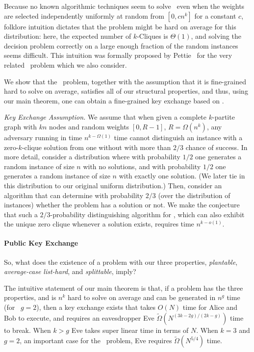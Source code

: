 Because no known algorithmic techniques seem to solve \zkclique~even when the weights are selected independently uniformly at random from $[0,cn^k]$ for a constant $c$, folklore intuition dictates that the problem might be hard on average for this distribution: here, the expected number of $k$-Cliques is $\Theta(1)$, and solving the decision problem correctly on a large enough fraction of the random instances seems difficult.
This intuition was formally proposed by Pettie~\cite{avgCase3Sum} for the very related \kSum~problem which we also consider.

We show that the \zkclique~problem, together with the assumption that it is fine-grained hard to solve on average, satisfies all of our structural properties, and thus, using our main theorem, one can obtain a fine-grained key exchange based on 
\zkclique.

\textit{Key Exchange Assumption.} We assume that when given a complete $k$-partite graph with $kn$ nodes and random weights $[0,R-1]$, $R = \Omega(n^k)$, any adversary running in time $n^{k-\Omega(1)}$ time cannot distinguish an instance with a zero-$k$-clique solution from one without with more than $2/3$ chance of success.
In more detail, consider a distribution where with probability $1/2$ one generates a random instance of size $n$ with no solutions, and with probability $1/2$ one generates a random instance of size $n$ with exactly one solution. (We later tie in this distribution to our original uniform distribution.) Then, consider an algorithm that can determine with probability $2/3$ (over the distribution of instances) whether the problem has a solution or not.
We make the conjecture that such a $2/3$-probability distinguishing algorithm for \zkclique, which can also exhibit the unique zero clique whenever a solution exists, 
requires time $n^{k-o(1)}$.



\paragraph{Public Key Exchange}

So, what does the existence of a problem with our three properties, \emph{plantable}, \emph{average-case list-hard}, and \emph{splittable}, imply?

The intuitive statement of our main theorem is that, if a problem has the three properties, and is $n^k$ hard to solve on average and can be generated in $n^g$ time (for \zkclique~$g=2$), then a key exchange exists that takes $O(N)$ time for Alice and Bob to execute, and requires an eavesdropper Eve $\tilde{\Omega}(N^{(3k-2g)/(2k-g)})$ time to break. When $k>g$ Eve takes super linear time in terms of $N$. When $k=3$ and $g=2$, an important case for the \zkclique~problem, Eve requires $\tilde{\Omega}(N^{5/4})$ time. 

